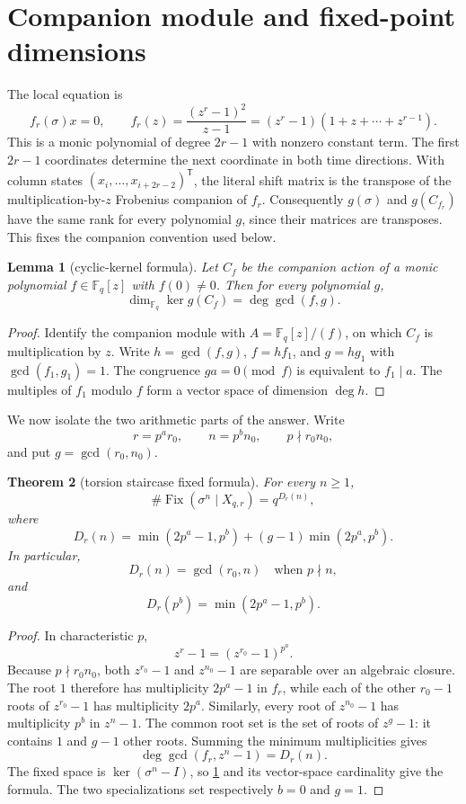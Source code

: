 \documentclass[11pt,a4paper]{amsart}
\newtheorem{theorem}{Theorem}[section]
\newtheorem{lemma}[theorem]{Lemma}
\theoremstyle{definition}
\theoremstyle{remark}
\newcommand{\Fq}{\mathbb F_q}
\newcommand{\Fix}{\operatorname{Fix}}
\begin{document}
\section{Companion module and fixed-point dimensions}

The local equation is
\[
 f_r(\sigma)x=0,
 \qquad
 f_r(z)=\frac{(z^r-1)^2}{z-1}
       =(z^r-1)(1+z+\cdots+z^{r-1}).
\]
This is a monic polynomial of degree $2r-1$ with nonzero constant term.
The first $2r-1$ coordinates determine the next coordinate in both time
directions.  With column states
$(x_i,\ldots,x_{i+2r-2})^{\mathsf T}$, the literal shift matrix is the
transpose of the multiplication-by-$z$ Frobenius companion of $f_r$.
Consequently $g(\sigma)$ and $g(C_{f_r})$ have the same rank for every
polynomial $g$, since their matrices are transposes.  This fixes the
companion convention used below.

\begin{lemma}[cyclic-kernel formula]\label{lem:gcd}
Let $C_f$ be the companion action of a monic polynomial $f\in\Fq[z]$ with
$f(0)\ne0$.  Then for every polynomial $g$,
\[
 \dim_{\Fq}\ker g(C_f)=\deg\gcd(f,g).
\]
\end{lemma}

\begin{proof}
Identify the companion module with $A=\Fq[z]/(f)$, on which $C_f$ is
multiplication by $z$.  Write $h=\gcd(f,g)$, $f=hf_1$, and $g=hg_1$ with
$\gcd(f_1,g_1)=1$.  The congruence $ga=0\pmod f$ is equivalent to
$f_1\mid a$.  The multiples of $f_1$ modulo $f$ form a vector space of
dimension $\deg h$.
\end{proof}

We now isolate the two arithmetic parts of the answer.  Write
\[
 r=p^a r_0,\qquad n=p^b n_0,
 \qquad p\nmid r_0n_0,
\]
and put $g=\gcd(r_0,n_0)$.

\begin{theorem}[torsion staircase fixed formula]\label{thm:fixed}
For every $n\geq1$,
\[
 \boxed{\#\Fix(\sigma^n\mid X_{q,r})=q^{D_r(n)},}
\]
where
\[
 \boxed{D_r(n)=
 \min(2p^a-1,p^b)
 +(g-1)\min(2p^a,p^b).}
\]
In particular,
\[
 D_r(n)=\gcd(r_0,n)\quad\text{when }p\nmid n,
\]
and
\[
 D_r(p^b)=\min(2p^a-1,p^b).
\]
\end{theorem}

\begin{proof}
In characteristic $p$,
\[
 z^r-1=(z^{r_0}-1)^{p^a}.
\]
Because $p\nmid r_0n_0$, both $z^{r_0}-1$ and $z^{n_0}-1$ are separable
over an algebraic closure.
The root $1$ therefore has multiplicity $2p^a-1$ in $f_r$, while each of
the other $r_0-1$ roots of $z^{r_0}-1$ has multiplicity $2p^a$.  Similarly,
every root of $z^{n_0}-1$ has multiplicity $p^b$ in $z^n-1$.  The common
root set is the set of roots of $z^g-1$: it contains $1$ and $g-1$ other
roots.  Summing the minimum multiplicities gives
\[
 \deg\gcd(f_r,z^n-1)=D_r(n).
\]
The fixed space is $\ker(\sigma^n-I)$, so \cref{lem:gcd} and its vector-space
cardinality give the formula.  The two specializations set respectively
$b=0$ and $g=1$.
\end{proof}
\end{document}
